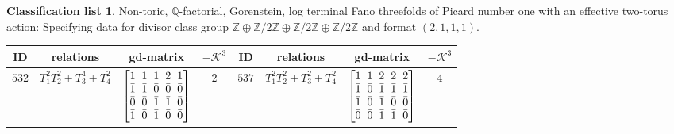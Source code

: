 \documentclass[10pt,a4paper]{amsart}
\theoremstyle{definition}
\newtheorem{class-list}[thm]{Classification list}
\def\ZZ{{\mathbb Z}}
\def\QQ{{\mathbb Q}}
\numberwithin{equation}{section}
\begin{document}
\begin{class-list}
Non-toric, $\QQ$-factorial, Gorenstein, log terminal Fano
threefolds of Picard number one with an effective two-torus action:
Specifying data for divisor class group
$\ZZ\oplus \ZZ/2\ZZ\oplus \ZZ/2\ZZ\oplus \ZZ/2\ZZ$ and format $(2,1,1,1)$.
\begin{table}[h!]\centering\setlength{\tabcolsep}{3.5pt}
\renewcommand{\arraystretch}{1.15}\small\tabulinesep=1mm
\begin{tabu}{c|c|c|c||c|c|c|c}
\hline
ID&relations&gd-matrix&$-\mathcal{K}^3$&ID&relations&gd-matrix&$-\mathcal{K}^3$
\\
\hline
${532}$&${T_{1}^{2}T_{2}^{2}+T_{3}^{4}+T_{4}^{2}}$
&$\arraycolsep=1mm\begin{bmatrix}{1} & {1} & {1} & {2} & {1} \\ {\bar{1}} & {\bar{1}} & {\bar{0}} & {\bar{0}} & {\bar{0}} \\ {\bar{0}} & {\bar{0}} & {\bar{1}} & {\bar{1}} & {\bar{0}} \\ {\bar{1}} & {\bar{0}} & {\bar{1}} & {\bar{0}} & {\bar{0}}\end{bmatrix}$
&${2}$
&${537}$&${T_{1}^{2}T_{2}^{2}+T_{3}^{2}+T_{4}^{2}}$
&$\arraycolsep=1mm\begin{bmatrix}{1} & {1} & {2} & {2} & {2} \\ {\bar{1}} & {\bar{0}} & {\bar{1}} & {\bar{1}} & {\bar{1}} \\ {\bar{1}} & {\bar{0}} & {\bar{1}} & {\bar{0}} & {\bar{0}} \\ {\bar{0}} & {\bar{0}} & {\bar{1}} & {\bar{1}} & {\bar{0}}\end{bmatrix}$
&${4}$
\\
\hline
\end{tabu}%
\end{table}
\end{class-list}
\end{document}
